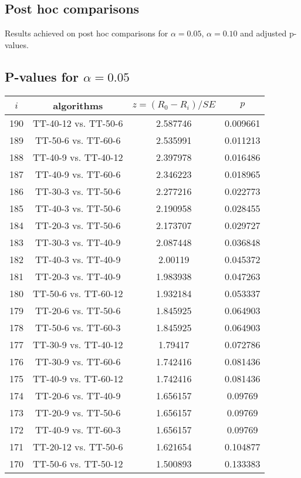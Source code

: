 \documentclass[a4paper,10pt]{article}
\begin{document}
\begin{landscape}
\pagebreak

\section{Post hoc comparisons}

Results achieved on post hoc comparisons for $\alpha = 0.05$, $\alpha = 0.10$ and adjusted p-values.

\subsection{P-values for $\alpha=0.05$}

\begin{table}[!htp]
\centering\scriptsize
\begin{tabular}{cccc}
$i$&algorithms&$z=(R_0 - R_i)/SE$&$p$\\
\hline190&TT-40-12 vs. TT-50-6&2.587746&0.009661\\
189&TT-50-6 vs. TT-60-6&2.535991&0.011213\\
188&TT-40-9 vs. TT-40-12&2.397978&0.016486\\
187&TT-40-9 vs. TT-60-6&2.346223&0.018965\\
186&TT-30-3 vs. TT-50-6&2.277216&0.022773\\
185&TT-40-3 vs. TT-50-6&2.190958&0.028455\\
184&TT-20-3 vs. TT-50-6&2.173707&0.029727\\
183&TT-30-3 vs. TT-40-9&2.087448&0.036848\\
182&TT-40-3 vs. TT-40-9&2.00119&0.045372\\
181&TT-20-3 vs. TT-40-9&1.983938&0.047263\\
180&TT-50-6 vs. TT-60-12&1.932184&0.053337\\
179&TT-20-6 vs. TT-50-6&1.845925&0.064903\\
178&TT-50-6 vs. TT-60-3&1.845925&0.064903\\
177&TT-30-9 vs. TT-40-12&1.79417&0.072786\\
176&TT-30-9 vs. TT-60-6&1.742416&0.081436\\
175&TT-40-9 vs. TT-60-12&1.742416&0.081436\\
174&TT-20-6 vs. TT-40-9&1.656157&0.09769\\
173&TT-20-9 vs. TT-50-6&1.656157&0.09769\\
172&TT-40-9 vs. TT-60-3&1.656157&0.09769\\
171&TT-20-12 vs. TT-50-6&1.621654&0.104877\\
170&TT-50-6 vs. TT-50-12&1.500893&0.133383\\

\end{tabular}
\end{table}
\end{landscape}
\end{document}

